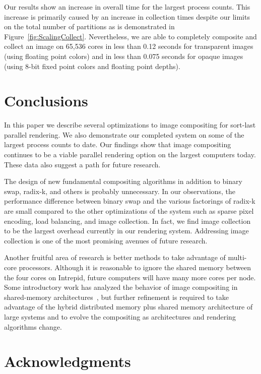 \documentclass{sig-alternate}
\newcommand*{\lcite}[1]{~\cite{#1}}
\begin{document}
Our results show an increase in overall time for the largest process
counts.  This increase is primarily caused by an increase in collection
times despite our limits on the total number of partitions as is
demonstrated in Figure~\ref{fig:ScalingCollect}.  Nevertheless, we are able
to completely composite and collect an image on 65,536 cores in less than
0.12 seconds for transparent images (using floating point colors) and in
less than 0.075 seconds for opaque images (using 8-bit fixed point colors
and floating point depths).

\section{Conclusions}
\label{sec:Conclusions}

In this paper we describe several optimizations to image compositing for
sort-last parallel rendering.  We also demonstrate our completed system on
some of the largest process counts to date.  Our findings show that image
compositing continues to be a viable parallel rendering option on the
largest computers today.  These data also suggest a path for future
research.

The design of new fundamental compositing algorithms in addition to binary
swap, radix-k, and others is probably unnecessary.  In our observations,
the performance difference between binary swap and the various factorings
of radix-k are small compared to the other optimizations of the system such
as sparse pixel encoding, load balancing, and image collection.  In fact,
we find image collection to be the largest overhead currently in our
rendering system.  Addressing image collection is one of the most promising
avenues of future research.

Another fruitful area of research is better methods to take advantage of
multi-core processors.  Although it is reasonable to ignore the shared
memory between the four cores on Intrepid, future computers will have many
more cores per node.  Some introductory work has analyzed the behavior of
image compositing in shared-memory
architectures\lcite{Howison2010,Nouanesengsy2011,Reinhard2000,Peterka2008},
but further refinement is required to take advantage of the hybrid
distributed memory plus shared memory architecture of large systems and to
evolve the compositing as architectures and rendering algorithms change.

\section{Acknowledgments}
\end{document}
